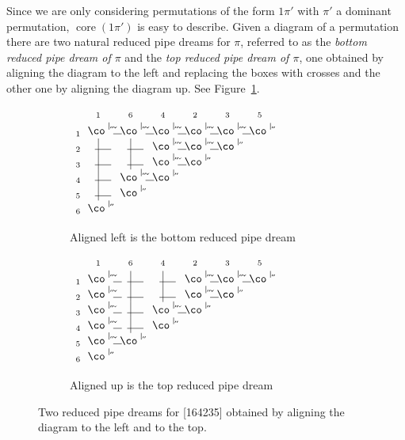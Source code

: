 \documentclass[10pt]{amsart}
\theoremstyle{definition}
\numberwithin{equation}{section}
\DeclareMathOperator{\core}{core}
\newcommand*\petit[1]{{\scriptstyle #1}}
\newcommand*\jr{\smash{\raise2pt\hbox{\co \rlap{\rlap{\char'005} \char'007}}\raise6pt\hbox{\rlap{\vrule height6.5pt}}\raise2pt\hbox{\rlap{\hskip4pt \vrule height0.4pt depth0pt width7.7pt}}}}
\newcommand*\je{\smash{\raise2pt\hbox{\co \rlap{\rlap{\char'005}\phantom{\char'007}}}\raise6pt\hbox{\rlap{\vrule height6pt}}}}
\newcommand*\+{\smash{\lower2pt\hbox{\rlap{\vrule height14pt}}\raise2pt\hbox{\rlap{\hskip-3pt \vrule height.4pt depth0pt width14.7pt}}}}
\newcommand*\perm[2]{\hbox{\rlap{$\petit {#1}_{\scriptscriptstyle #2}$}}\phantom{\petit 1}}
\begin{document}
Since we are only considering permutations of the form $1\pi'$ with $\pi'$ a dominant permutation, $\core(1\pi')$ is easy to describe. Given a diagram of a permutation there are two natural reduced pipe dreams for $\pi$, referred to as the \emph{bottom reduced pipe dream of $\pi$} and the \emph{top reduced pipe dream of $\pi$}, one obtained by aligning the diagram to the left and replacing the boxes with crosses and the other one by aligning the diagram up. See Figure~\ref{fig:topbottomrpd}.

\begin{figure}[h]
\begingroup
\arraycolsep=5pt
\centering
\begin{subfigure}[b]{0.35\textwidth}
\centering $
\begin{array}{ccccccc}
&\perm1{}&\perm6{}&\perm4{}&\perm2{}&\perm3{}&\perm5{}\\[0.5em]
\petit1\!\!& \jr & \jr & \jr & \jr & \jr & \je \\[0.2em]
\petit2\!\!& \+ & \+ & \jr & \jr & \je &\\[0.2em]
\petit3\!\!& \+ & \+ & \jr & \je &\\[0.2em]
\petit4\!\!& \+ & \jr & \je &\\[0.2em]
\petit5\!\!& \+ & \je & &\\[0.2em]
\petit6\!\!& \je & & &\\
\end{array}
$
\caption{Aligned left is the bottom reduced pipe dream}
\end{subfigure}
\qquad\quad
\begin{subfigure}[b]{0.4\textwidth}
\centering $
\begin{array}{ccccccc}
&\perm1{}&\perm6{}&\perm4{}&\perm2{}&\perm3{}&\perm5{}\\[0.5em]
\petit1\!\!& \jr & \+ & \+ & \jr & \jr & \je \\[0.2em]
\petit2\!\!& \jr & \+ & \+ & \jr & \je &\\[0.2em]
\petit3\!\!& \jr & \+ & \jr & \je &\\[0.2em]
\petit4\!\!& \jr & \+ & \je &\\[0.2em]
\petit5\!\!& \jr & \je & &\\[0.2em]
\petit6\!\!& \je & & &\\
\end{array}
$
\caption{Aligned up is the top reduced pipe dream}
\end{subfigure}
\endgroup
\caption{Two reduced pipe dreams for [164235] obtained by aligning the diagram to the left and to the top.} \label{fig:topbottomrpd}
\end{figure}
\end{document}
